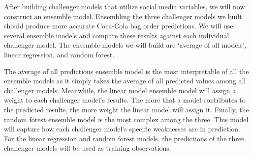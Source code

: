 \documentclass[12pt,oneside]{chicagocapstone}
\begin{document}
After building challenger models that utilize social media variables, we will now construct an ensemble model. Ensembling the three challenger models we built should produce more accurate Coca-Cola bag order predictions. We will use several ensemble models and compare these results against each individual challenger model. The ensemble models we will build are `average of all models', linear regression, and random forest.

The average of all predictions ensemble model is the most interpretable of all the ensemble models as it simply takes the average of all predicted values among all challenger models. Meanwhile, the linear model ensemble model will assign a weight to each challenger model's results. The more that a model contributes to the predicted results, the more weight the linear model will assign it. Finally, the random forest ensemble model is the most complex among the three. This model will capture how each challenger model's specific weaknesses are in prediction. For the linear regression and random forest models, the predictions of the three challenger models will be used as training observations.
\end{document}
